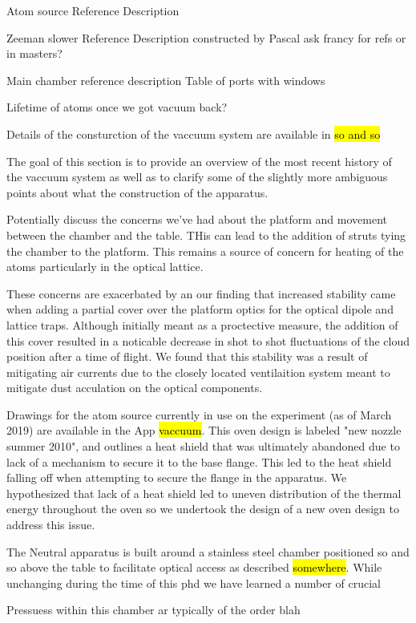 Atom source
	Reference
	Description
	
	
Zeeman slower
	Reference
	Description
		constructed by Pascal
		ask francy for refs or in masters?
		
Main chamber
	reference
	description
	Table of ports with windows
	
	
Lifetime of atoms once we got vacuum back?

Details of the consturction of the vaccuum system are available in \hl{so and so}

The goal of this section is to provide an overview of the most recent history of the vaccuum system as well as to clarify some of the slightly more ambiguous points about what the construction of the apparatus.

Potentially discuss the concerns we've had about the platform and movement between the chamber and the table. THis can lead to the addition of struts tying the chamber to the platform. This remains a source of concern for heating of the atoms particularly in the optical lattice. 

These concerns are exacerbated by an our finding that increased stability came when adding a partial cover over the platform optics for the optical dipole and lattice traps. Although initially meant as a proctective measure, the addition of this cover resulted in a noticable decrease in shot to shot fluctuations of the cloud position after a time of flight. We found that this stability was a result of mitigating air currents due to the closely located ventilaition system meant to mitigate dust acculation on the optical components.

Drawings for the atom source currently in use on the experiment (as of March 2019) are available in the App \hl{vaccuum}. This oven design is labeled "new nozzle summer 2010", and outlines a heat shield that was ultimately abandoned due to lack of a mechanism to secure it to the base flange. This led to the heat shield falling off when attempting to secure the flange in the apparatus. We hypothesized that lack of a heat shield led to uneven distribution of the thermal energy throughout the oven so we undertook the design of a new oven design to address this issue.

The Neutral apparatus is built around a stainless steel chamber positioned so and so above the table to facilitate optical access as described \hl{somewhere}. While unchanging during the time of this phd we have learned a number of crucial 

Pressuess within this chamber ar typically of the order blah


